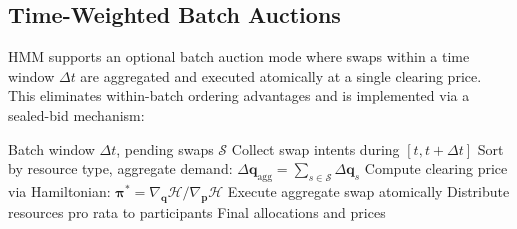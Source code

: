 \subsection{Time-Weighted Batch Auctions}

HMM supports an optional batch auction mode where swaps within a time window $\Delta t$ are aggregated and executed atomically at a single clearing price. This eliminates within-batch ordering advantages and is implemented via a sealed-bid mechanism:

\begin{algorithm}[H]
\caption{HMM Batch Auction}
\label{alg:batch}
\begin{algorithmic}[1]
\Require Batch window $\Delta t$, pending swaps $\mathcal{S}$
\State Collect swap intents during $[t, t + \Delta t]$
\State Sort by resource type, aggregate demand: $\Delta\bm{q}_{\text{agg}} = \sum_{s \in \mathcal{S}} \Delta\bm{q}_s$
\State Compute clearing price via Hamiltonian: $\bm{\pi}^* = \nabla_{\bm{q}} \mathcal{H} / \nabla_{\bm{p}} \mathcal{H}$
\State Execute aggregate swap atomically
\State Distribute resources pro rata to participants
\State \Return Final allocations and prices
\end{algorithmic}
\end{algorithm}

